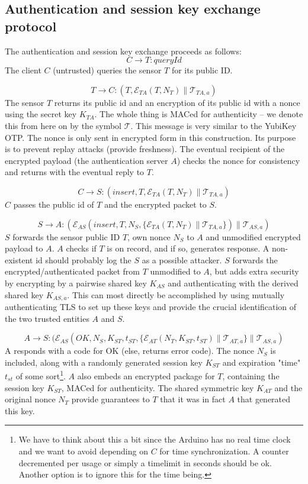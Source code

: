 \documentclass[10pt,a4paper]{article}
\begin{document}
\subsection{Authentication and session key exchange protocol}

The authentication and session key exchange proceeds as follows:
\[
C \rightarrow T: \textit{queryId}
\]
The client $C$ (untrusted) queries the sensor $T$ for its public ID.

\[
T \rightarrow C: (T,\mathcal{E}_{TA}(T,N_T) \parallel \mathcal{T}_{TA,a})
\]
The sensor $T$ returns its public id and an encryption of its public id with a nonce using the secret key $K_{TA}$. The whole thing is MACed for authenticity -- we denote this from here on by the symbol $\mathcal{T}$. This message is very similar to the YubiKey OTP. The nonce is only sent in encrypted form in this construction. Its purpose is to prevent replay attacks (provide freshness). The eventual recipient of the encrypted payload (the authentication server $A$) checks the nonce for consistency and returns with the eventual reply to $T$.

\[
C\rightarrow S: (insert,T,\mathcal{E}_{TA}(T,N_T) \parallel \mathcal{T}_{TA,a})
\]
$C$ passes the public id of $T$ and the encrypted packet to $S$.

\[
S \rightarrow A: (\mathcal{E}_{AS}(insert,T,N_S, \{ \mathcal{E}_{TA}(T,N_T) \parallel \mathcal{T}_{TA,a} \}) \parallel \mathcal{T}_{AS,a})
\]
$S$ forwards the sensor public ID $T$, own nonce $N_S$ to $A$ and unmodified encrypted payload to $A$. $A$ checks if $T$ is on record, and if so, generates response. A non-existent id should probably log the $S$ as a possible attacker. 
%
$S$ forwards the encrypted/authenticated packet from $T$ unmodified to $A$, but adds extra security by encrypting by a pairwise shared key $K_{AS}$ and authenticating with the derived shared key $K_{AS,a}$. This can most directly be accomplished by using mutually authenticating TLS to set up these keys and provide the crucial identification of the two trusted entities $A$ and $S$.

\[
A \rightarrow S: (\mathcal{E}_{AS}(OK,N_S,K_{ST},t_{ST}, \{ \mathcal{E}_{AT}(N_T,K_{ST},t_{ST}) \parallel \mathcal{T}_{AT,a} \} \parallel \mathcal{T}_{AS,a})
\]
A responds with a code for OK (else, returns error code). The nonce $N_S$ is included, along with a randomly generated session key $K_{ST}$ and expiration "time" $t_{st}$ of some sort\footnote{We have to think about this a bit since the Arduino has no real time clock and we want to avoid depending on $C$ for time synchronization. A counter decremented per usage or simply a timelimit in seconds should be ok. Another option is to ignore this for the time being.}. $A$ also embeds an encrypted package for $T$, containing the session key $K_{ST}$, MACed for authenticity. The shared symmetric key $K_{AT}$ and the original nonce $N_T$ provide guarantees to $T$ that it was in fact $A$ that generated this key.
\end{document}
